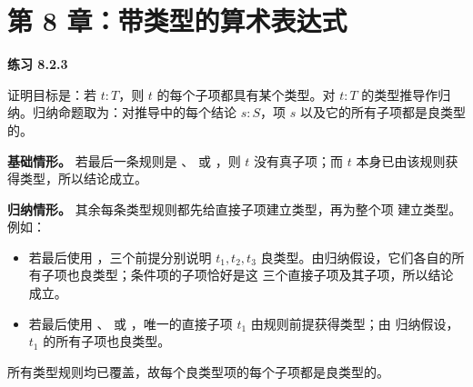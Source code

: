 \section*{第 8 章：带类型的算术表达式}

\begin{taplsolutionentrybox}
\label{sol:translator:8.2.3}
\textbf{练习 8.2.3}

证明目标是：若 \(t:T\)，则 \(t\) 的每个子项都具有某个类型。对
\(t:T\) 的类型推导作归纳。归纳命题取为：对推导中的每个结论
\(s:S\)，项 \(s\) 以及它的所有子项都是良类型的。

\textbf{基础情形。} 若最后一条规则是 、
 或 ，则 \(t\) 没有真子项；而
\(t\) 本身已由该规则获得类型，所以结论成立。

\textbf{归纳情形。} 其余每条类型规则都先给直接子项建立类型，再为整个项
建立类型。例如：

\begin{itemize}
  \item 若最后使用 ，三个前提分别说明 \(t_1,t_2,t_3\)
    良类型。由归纳假设，它们各自的所有子项也良类型；条件项的子项恰好是这
    三个直接子项及其子项，所以结论成立。
  \item 若最后使用 、 或
    ，唯一的直接子项 \(t_1\) 由规则前提获得类型；由
    归纳假设，\(t_1\) 的所有子项也良类型。
\end{itemize}

所有类型规则均已覆盖，故每个良类型项的每个子项都是良类型的。

\end{taplsolutionentrybox}

